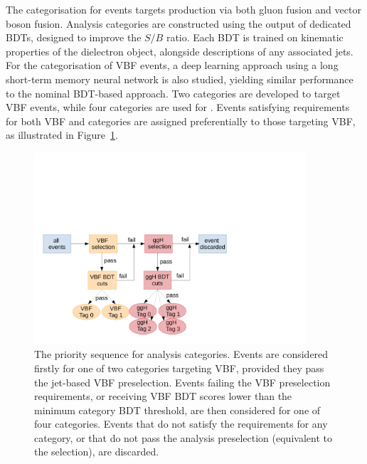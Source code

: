 The categorisation for \Hee events targets production via both gluon fusion and vector boson fusion. Analysis categories are constructed using the output of dedicated BDTs, designed to improve the $S/B$ ratio. Each BDT is trained on kinematic properties of the dielectron object, alongside descriptions of any associated jets. For the categorisation of VBF events, a deep learning approach using a long short-term memory neural network is also studied, yielding similar performance to the nominal BDT-based approach. Two categories are developed to target VBF events, while four categories are used for \ggH. Events satisfying requirements for both VBF and \ggH categories are assigned preferentially to those targeting VBF, as illustrated in Figure~\ref{fig:hee_tag_sequence}.

\begin{figure}[htbp!]
\centering
\includegraphics[trim={0cm 0cm 7cm 7cm}, clip, width=0.9\textwidth]{Figures/Hee/Misc/tagSequence.pdf}\hfill%
\caption[The priority sequence for categorisation of \Hee events.]{The priority sequence for \Hee analysis categories. Events are considered firstly for one of two categories targeting VBF, provided they pass the jet-based VBF preselection. Events failing the VBF preselection requirements, or receiving VBF BDT scores lower than the minimum category BDT threshold, are then considered for one of four \ggH categories. Events that do not satisfy the requirements for any category, or that do not pass the analysis preselection (equivalent to the \ggH selection), are discarded.}
\label{fig:hee_tag_sequence}
\end{figure}